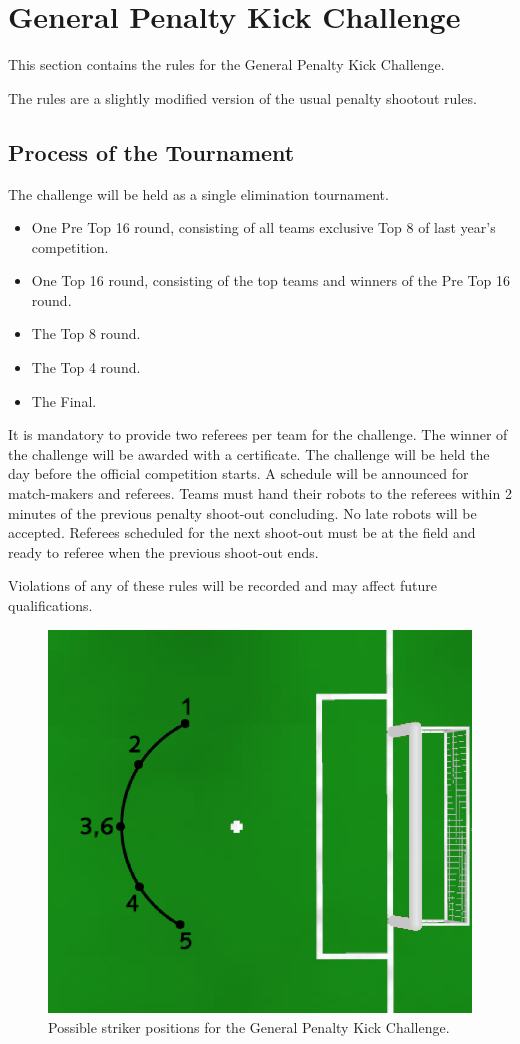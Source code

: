 \documentclass[12pt]{article}
\begin{document}
\newpage
\section{General Penalty Kick Challenge}
\label{sec:generalPenaltyKickChallenge}
This section contains the rules for the General Penalty Kick Challenge.

The rules are a slightly modified version of the usual penalty shootout rules.

\subsection{Process of the Tournament}
The challenge will be held as a single elimination tournament.
\begin{itemize}
  \item One Pre Top 16 round, consisting of all teams exclusive Top 8 of last
  year's competition.
  \item One Top 16 round, consisting of the top teams and winners of the Pre
  Top 16 round.
  \item The Top 8 round.
  \item The Top 4 round.
  \item The Final.
\end{itemize}

It is mandatory to provide two referees per team for the challenge.
The winner of the challenge will be awarded with a certificate.
The challenge will be held the day before the official competition starts.
A schedule will be announced for match-makers and referees. Teams must hand their robots to the referees within 2 minutes of the previous penalty shoot-out concluding. No late robots will be accepted. Referees scheduled for the next shoot-out must be at the field and ready to referee when the previous shoot-out ends.

Violations of any of these rules will be recorded and may affect future qualifications.

\begin{figure}[ht]
  \centerline{\includegraphics[width=0.5\columnwidth]{figs/general_penalty_setup}}
  \caption{Possible striker positions for the General Penalty Kick Challenge.}
  \label{fig:general_penalty_setup}
\end{figure}
\end{document}
